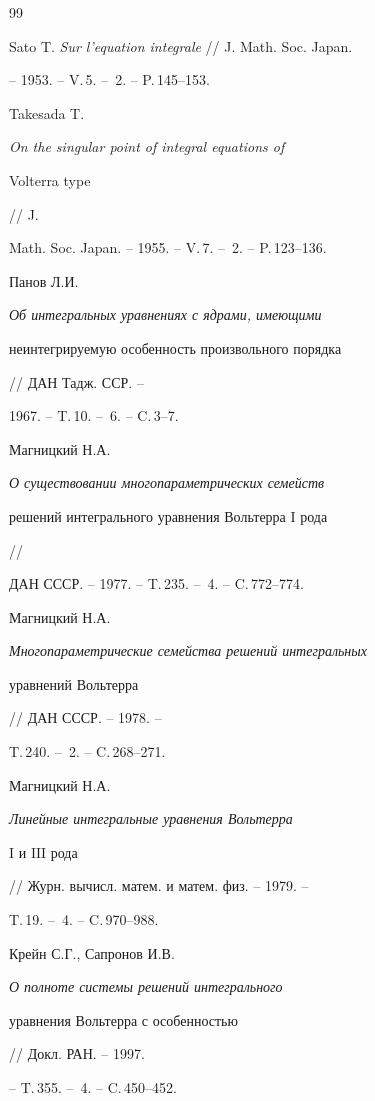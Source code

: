 \begin{thebibliography}{99}







Sato T. {\em Sur l'equation integrale} // J. Math. Soc. Japan.


-- 1953. -- V.\,5. -- \No\,2. -- P.\,145--153.




Takesada T. {\em On the singular point of integral equations of 


Volterra type} // J. 


Math. Soc. Japan. -- 1955. -- V.\,7. -- \No\,2. -- P.\,123--136.




Панов Л.И. {\em Об интегральных уравнениях с ядрами, имеющими 


неинтегрируемую особенность произвольного порядка} // ДАН Тадж. ССР. -- 


1967. -- T.\,10. -- \No\,6. -- C.\,3--7.




Магницкий Н.А. {\em О существовании многопараметрических семейств 


решений интегрального уравнения Вольтерра $\mathrm I$ рода} //


ДАН СССР. -- 1977. -- T.\,235. -- \No\,4. -- C.\,772--774.




Магницкий Н.А. {\em Многопараметрические семейства решений интегральных 


уравнений Вольтерра} // ДАН СССР. -- 1978. -- 


T.\,240. -- \No\,2. -- C.\,268--271.




Магницкий Н.А. {\em Линейные интегральные уравнения Вольтерра


$\mathrm I$ и $\mathrm{III}$ рода} 


// Журн. вычисл. матем. и матем. физ. -- 1979. -- 


T.\,19. -- \No\,4. -- C.\,970--988.




Крейн С.Г., Сапронов И.В. {\em О полноте системы решений интегрального 


уравнения Вольтерра с особенностью} // Докл. РАН. -- 1997.


-- T.\,355. -- \No\,4. -- C.\,450--452.





\end{thebibliography}
